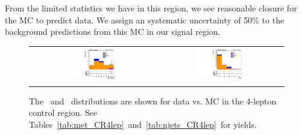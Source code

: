 From the limited statistics we have in this region, we see reasonable closure for the MC to predict data.
We assign an systematic uncertainty of 50\% to the background predictions from this MC in our signal region.


\begin{figure}[!htb]
\begin{center}
\begin{tabular}{cc}
\includegraphics[width=0.4\textwidth]{bkgd/figs/h_metall_ll_signalregion_CR4lep_passtrig.pdf} &
\includegraphics[width=0.4\textwidth]{bkgd/figs/h_njtall_ll_signalregion_CR4lep_passtrig.pdf} \\
\end{tabular}
\caption{The \MET\ and \nj\ distributions are shown for data vs. MC in the 4-lepton control region.
See Tables~\ref{tab:met_CR4lep}~and~\ref{tab:njets_CR4lep}~for yields.
\label{fig:bkg_CR4lep}
}
\end{center}
\end{figure}




